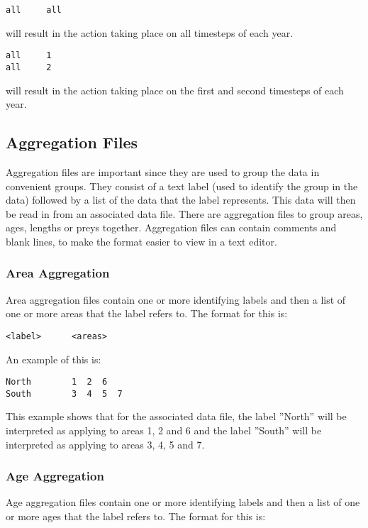 \documentclass [a4paper, 10pt]{book}
\begin{document}
{\small\begin{verbatim}
all     all
\end{verbatim}}
will result in the action taking place on all timesteps of each year.

{\small\begin{verbatim}
all     1
all     2
\end{verbatim}}
will result in the action taking place on the first and second timesteps of each year.

\subsection{Aggregation Files}
Aggregation files are important since they are used to group the data in convenient groups.  They consist of a text label (used to identify the group in the data) followed by a list of the data that the label represents.  This data will then be read in from an associated data file.  There are aggregation files to group areas, ages, lengths or preys together.  Aggregation files can contain comments and blank lines, to make the format easier to view in a text editor.

\subsubsection{Area Aggregation}
Area aggregation files contain one or more identifying labels and then a list of one or more areas that the label refers to.  The format for this is:

{\small\begin{verbatim}
<label>      <areas>
\end{verbatim}}

An example of this is:

{\small\begin{verbatim}
North        1  2  6
South        3  4  5  7
\end{verbatim}}

This example shows that for the associated data file, the label ''North'' will be interpreted as applying to areas 1, 2 and 6 and the label ''South'' will be interpreted as applying to areas 3, 4, 5 and 7.

\subsubsection{Age Aggregation}
Age aggregation files contain one or more identifying labels and then a list of one or more ages that the label refers to.  The format for this is:
\end{document}
